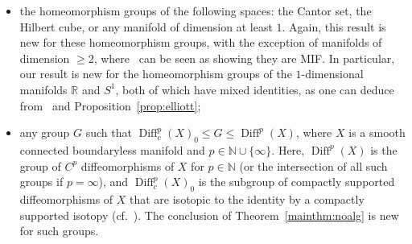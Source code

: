 \documentclass{article}
\theoremstyle{remark}
\theoremstyle{definition}
\DeclareMathOperator{\Homeo}{Homeo}
\DeclareMathOperator{\Diff}{Diff}
\DeclareMathOperator{\ZZ}{Z}
\newcommand{\zar}{\tau_{\ZZ}}
\begin{document}
\begin{itemize}
\begin{itemize}
\item the homeomorphism groups of the
following spaces: the Cantor set, the Hilbert cube, or any manifold of dimension at least $1$. Again, this result is new for these homeomorphism groups, with the exception of manifolds of dimension $\geq 2$, where~\cite{elliott2026zariskitopologyhomeomorphismgroups} can be seen as showing they are MIF. In particular, our result is new for the homeomorphism groups of the $1$-dimensional manifolds {$\mathbb{R}$ and $S^1$},   %
both of which have mixed identities, as one can deduce from~\cite{elliott2026zariskitopologyhomeomorphismgroups} 
and Proposition~\ref{prop:elliott};  
\item any group $G$ such that $\Diff_c^p(X)_0\leq G\leq \Diff^p(X)$, where $X$ is a smooth connected boundaryless manifold and $p\in \mathbb{N}\cup\{\infty\}$. Here,  $\Diff^p(X)$ is the group of $C^p$ diffeomorphisms of $X$ for $p\in\mathbb{N}$ (or the intersection of all such groups if $p=\infty$), and $\Diff_c^p(X)_0$ is the subgroup of compactly supported diffeomorphisms of $X$ that are isotopic to the identity by a compactly supported isotopy (cf.~\cite[Chapter 6, $\S$ 6]{kim2021structure}). The conclusion of Theorem~\ref{mainthm:noalg} is new for such groups.

\end{itemize}
\end{itemize}
\end{document}
